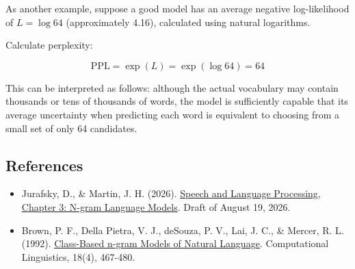 As another example, suppose a good model has an average negative log-likelihood of \(L=\log 64\) (approximately 4.16), calculated using natural logarithms.

Calculate perplexity:

\[
\mathrm{PPL}=\exp(L)=\exp(\log 64)=64
\]

This can be interpreted as follows: although the actual vocabulary may contain thousands or tens of thousands of words, the model is sufficiently capable that its average uncertainty when predicting each word is equivalent to choosing from a small set of only 64 candidates.

\FloatBarrier
{}
\hypertarget{references-108}{%
\subsection{References}\label{references-108}}

\vspace{0.25em}
\begin{itemize}
\tightlist
\item
  Jurafsky, D., \& Martin, J. H. (2026). \href{https://web.stanford.edu/~jurafsky/slp3/3.pdf}{Speech and Language Processing, Chapter 3: N-gram Language Models}. Draft of August 19, 2026.
\item
  Brown, P. F., Della Pietra, V. J., deSouza, P. V., Lai, J. C., \& Mercer, R. L. (1992). \href{https://aclanthology.org/J92-4003/}{Class-Based n-gram Models of Natural Language}. Computational Linguistics, 18(4), 467-480.
\end{itemize}

\clearpage
